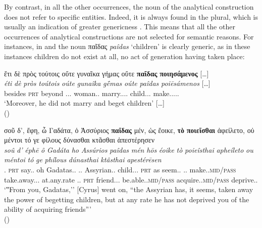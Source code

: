 \documentclass[output=paper,colorlinks,citecolor=brown]{langscibook}
\begin{document}
By contrast, in all the other occurrences, the noun of the analytical construction does not refer to specific entities. Indeed, it is always found in the plural, which is usually an indication of greater genericness \citep[225]{timberlake1975hierarchies}. This means that all the other occurrences of analytical constructions are not selected for semantic reasons. For instances, in  and  the noun παῖδας \textit{paîdas} `children' is clearly generic, as in these instances children do not exist at all, no act of generation having taken place:

\ea \label{ex:7}
\glll ἔτι 	  δὲ 	πρὸς 		τούτοις 	οὔτε 	γυναῖκα 	γήμας οὔτε	\textbf{παῖδας}		\textbf{ποιησάμενος} [\ldots{}]\\
\textit{éti}	  \textit{dè}	\textit{pròs}		\textit{toútois}		\textit{oúte}	\textit{gunaîka}	\textit{gḗmas} \textit{oúte}	\textit{paîdas}		\textit{poiēsámenos} [\ldots{}]\\
besides \textsc{prt} beyond \Dem{}.\Dat{}.\N{}.\Pl{} \Neg{} woman.\Acc{}.\F{} marry.\Aor{}.\Ptcp{}.\Nom{}.\M{} \Neg{} child.\Acc{}.\M{}.\Pl{} make.\Aor{}.\Ptcp{}.\Mid{}.\Nom{}.\M{} {}\\
\glt `Moreover, he did not marry and beget children' [\ldots{}] \\
\hspace*{\fill}()
\z

\ea \label{ex:8}
\glll σοῦ 	{δ',} 	ἔφη, 		ὦ 	Γαδάτα, 	ὁ 		Ἀσσύριος \textbf{παῖδας}		μέν, 	ὡς 	ἔοικε, 		\textbf{τὸ}		\textbf{ποιεῖσθαι} ἀφείλετο,		    οὐ	μέντοι 	   τό 		γε    φίλους	          δύνασθαι κτᾶσθαι 			ἀπεστέρησεν\\
\textit{soû}	\textit{d’}	\textit{éphē}		\textit{ô}	\textit{Gadáta}		\textit{ho}		\textit{Assúrios} \textit{paîdas}		\textit{mén} 	\textit{hōs}	\textit{éoike}		\textit{tò}		\textit{poieîsthai} \textit{apheíleto}		    \textit{ou}	\textit{méntoi}	   \textit{tó}		\textit{ge}    \textit{phílous}	          \textit{dúnasthai} \textit{ktâsthai} 			\textit{apestérēsen}\\
\Ssg{}.\Gen{} \textsc{prt} say.\Impf{}.\Tsg{} oh Gadatas.\Voc{}.\M{} \Art{}.\Nom{}.\M{} Assyrian.\Nom{}.\M{} child.\Acc{}.\M{}.\Pl{} \textsc{prt} as seem.\Prf{}.\Tsg{} \Art{}.\Acc{}.\N{} make.\Inf{}.\textsc{mid/pass} take.away.\Aor{}.\Mid{}.\Tsg{} \Neg{} at.any.rate \Art{}.\Acc{}.\N{} \textsc{prt}  friend.\Acc{}.\M{}.\Pl{} be.able.\Inf{}.\textsc{mid/pass} acquire.\Inf{}.\textsc{mid/pass} deprive.\Aor{}.\Tsg{}\\
\glt `‟From you, Gadatas,'' [Cyrus] went on, ``the Assyrian has, it seems, taken away the power of begetting children, but at any rate he has not deprived you of the ability of acquiring friends''' \\
\hspace*{\fill}()
\z
\end{document}
